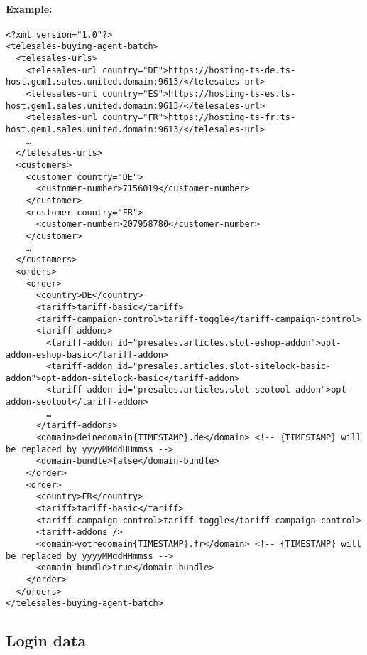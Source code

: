 \begin{landscape}
\paragraph{Example:}
\begin{verbatim}
<?xml version="1.0"?>
<telesales-buying-agent-batch>
  <telesales-urls>
    <telesales-url country="DE">https://hosting-ts-de.ts-host.gem1.sales.united.domain:9613/</telesales-url>
    <telesales-url country="ES">https://hosting-ts-es.ts-host.gem1.sales.united.domain:9613/</telesales-url>
    <telesales-url country="FR">https://hosting-ts-fr.ts-host.gem1.sales.united.domain:9613/</telesales-url>
    …
  </telesales-urls>
  <customers>
    <customer country="DE">
      <customer-number>7156019</customer-number>
    </customer>
    <customer country="FR">
      <customer-number>207958780</customer-number>
    </customer>
    …
  </customers>
  <orders>
    <order>
      <country>DE</country>
      <tariff>tariff-basic</tariff>
      <tariff-campaign-control>tariff-toggle</tariff-campaign-control>
      <tariff-addons>
        <tariff-addon id="presales.articles.slot-eshop-addon">opt-addon-eshop-basic</tariff-addon>
        <tariff-addon id="presales.articles.slot-sitelock-basic-addon">opt-addon-sitelock-basic</tariff-addon>
        <tariff-addon id="presales.articles.slot-seotool-addon">opt-addon-seotool</tariff-addon>
        …
      </tariff-addons>
      <domain>deinedomain{TIMESTAMP}.de</domain> <!-- {TIMESTAMP} will be replaced by yyyyMMddHHmmss -->
      <domain-bundle>false</domain-bundle>
    </order>
    <order>
      <country>FR</country>
      <tariff>tariff-basic</tariff>
      <tariff-campaign-control>tariff-toggle</tariff-campaign-control>
      <tariff-addons />
      <domain>votredomain{TIMESTAMP}.fr</domain> <!-- {TIMESTAMP} will be replaced by yyyyMMddHHmmss -->
      <domain-bundle>true</domain-bundle>
    </order>
  </orders>
</telesales-buying-agent-batch>
\end{verbatim}
\end{landscape}

\subsection{Login data}
